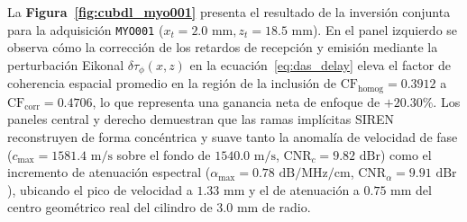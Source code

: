 \documentclass[9pt]{article}
\begin{document}
La \textbf{Figura~\ref{fig:cubdl_myo001}} presenta el resultado de la inversión conjunta para la adquisición \texttt{MYO001} ($x_t = 2.0\text{ mm}, z_t = 18.5\text{ mm}$). En el panel izquierdo se observa cómo la corrección de los retardos de recepción y emisión mediante la perturbación Eikonal $\delta\tau_\phi(x, z)$ en la ecuación~\eqref{eq:das_delay} eleva el factor de coherencia espacial promedio en la región de la inclusión de $\text{CF}_{\text{homog}} = 0.3912$ a $\text{CF}_{\text{corr}} = 0.4706$, lo que representa una ganancia neta de enfoque de $+20.30\%$. Los paneles central y derecho demuestran que las ramas implícitas SIREN reconstruyen de forma concéntrica y suave tanto la anomalía de velocidad de fase ($c_{\max} = 1581.4\text{ m/s}$ sobre el fondo de $1540.0\text{ m/s}$, $\text{CNR}_c = 9.82\text{ dBr}$) como el incremento de atenuación espectral ($\alpha_{\max} = 0.78\text{ dB/MHz/cm}$, $\text{CNR}_\alpha = 9.91\text{ dBr}$), ubicando el pico de velocidad a $1.33\text{ mm}$ y el de atenuación a $0.75\text{ mm}$ del centro geométrico real del cilindro de $3.0\text{ mm}$ de radio.
\end{document}
